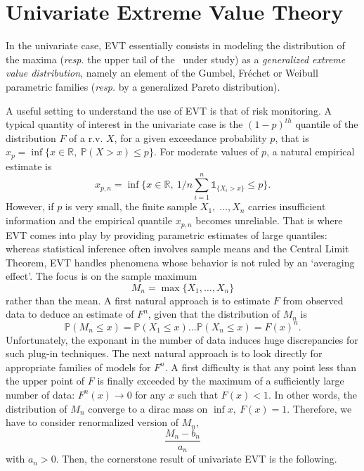
\section{Univariate Extreme Value Theory}
\label{back:sec:1EVT} 
In the univariate case, \textsc{EVT} essentially consists in modeling
the distribution of the maxima ({\it resp.} the upper tail of the \rv~under study) as a {\it generalized
extreme value distribution}, namely an element of the Gumbel, Fr\'echet
or Weibull parametric families ({\it resp.} by a generalized Pareto distribution).

A useful setting to understand the use of EVT is that of risk monitoring. A typical quantity of interest in the univariate case is the $(1-p)^{th}$
quantile of the distribution  $F$ of a r.v. $X$,  for a given exceedance probability $p$, that is
$x_p = \inf\{x \in \mathbb{R},~ \mathbb{P}(X > x) \le p\}$. For
moderate values of $p$, a natural empirical estimate is  $$x_{p,n} = \inf\{x \in
\mathbb{R},~ 1/n \sum_{i=1}^n \mathds{1}_{\{X_i > x\}}\le p\}.$$
However,  if $p$ is very small, the finite  sample $X_1,\; \ldots, X_n$  carries insufficient information and the empirical quantile $x_{p,n}$ becomes unreliable. 
That is where \textsc{EVT} comes into play  by providing parametric estimates of large
quantiles: %
whereas statistical inference often involves sample means and the
Central Limit Theorem, %
\textsc{EVT} handles phenomena whose behavior is %
not ruled by an `averaging effect'. The focus is on the sample maximum $$M_n = \max\{X_1,\ldots,X_n\}$$
rather than the mean. A first natural approach is to estimate $F$ from observed data to deduce an estimate of $F^n$, given that the distribution of $M_n$ is
$$\mathbb{P}(M_n \le x) = \mathbb{P}(X_1 \le x) \ldots \mathbb{P}(X_n \le x) = F(x)^n.$$
Unfortunately, the exponant in the number of data induces huge discrepancies for such plug-in techniques. The next natural approach is to look directly for appropriate families of models for $F^n$.
A first difficulty is that any point less than the upper point of $F$ is finally exceeded by the maximum of a sufficiently large number of data: $F^n(x) \to 0$ for any $x$ such that $F(x) < 1$. In other words, the distribution of $M_n$ converge to a dirac mass on $\inf{x,~F(x)=1}$. Therefore, we have to consider renormalized version of $M_n$, $$\frac{M_n-b_n}{a_n} $$ with $a_n>0$.
Then, the cornerstone result of univariate EVT is the following.

